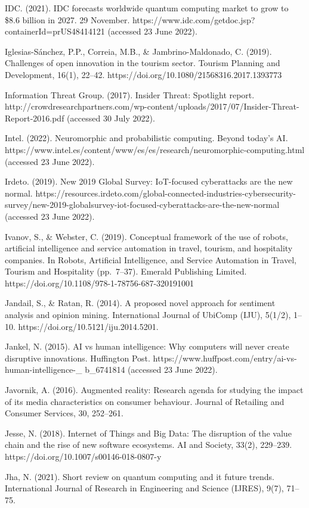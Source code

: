 \documentclass[
  letterpaper,
  DIV=11,
  numbers=noendperiod]{scrreprt}
\begin{document}
IDC. (2021). IDC forecasts worldwide quantum computing market to grow to
\$8.6 billion in 2027. 29 November.
https://www.idc.com/getdoc.jsp?containerId=prUS48414121 (accessed 23
June 2022).

Iglesias-Sánchez, P.P., Correia, M.B., \& Jambrino-Maldonado, C. (2019).
Challenges of open innovation in the tourism sector. Tourism Planning
and Development, 16(1), 22--42.
https://doi.org/10.1080/21568316.2017.1393773

Information Threat Group. (2017). Insider Threat: Spotlight report.
http://crowdresearchpartners.com/wp-content/uploads/2017/07/Insider-Threat-Report-2016.pdf
(accessed 30 July 2022).

Intel. (2022). Neuromorphic and probabilistic computing. Beyond today's
AI.
https://www.intel.es/content/www/es/es/research/neuromorphic-computing.html
(accessed 23 June 2022).

Irdeto. (2019). New 2019 Global Survey: IoT-focused cyberattacks are the
new normal.
https://resources.irdeto.com/global-connected-industries-cybersecurity-survey/new-2019-globalsurvey-iot-focused-cyberattacks-are-the-new-normal
(accessed 23 June 2022).

Ivanov, S., \& Webster, C. (2019). Conceptual framework of the use of
robots, artificial intelligence and service automation in travel,
tourism, and hospitality companies. In Robots, Artificial Intelligence,
and Service Automation in Travel, Tourism and Hospitality (pp.~7--37).
Emerald Publishing Limited.
https://doi.org/10.1108/978-1-78756-687-320191001

Jandail, S., \& Ratan, R. (2014). A proposed novel approach for
sentiment analysis and opinion mining. International Journal of UbiComp
(IJU), 5(1/2), 1--10. https://doi.org/10.5121/iju.2014.5201.

Jankel, N. (2015). AI vs human intelligence: Why computers will never
create disruptive innovations. Huffington Post.
https://www.huffpost.com/entry/ai-vs-human-intelligence-\_ b\_6741814
(accessed 23 June 2022).

Javornik, A. (2016). Augmented reality: Research agenda for studying the
impact of its media characteristics on consumer behaviour. Journal of
Retailing and Consumer Services, 30, 252--261.

Jesse, N. (2018). Internet of Things and Big Data: The disruption of the
value chain and the rise of new software ecosystems. AI and Society,
33(2), 229--239. https://doi.org/10.1007/s00146-018-0807-y

Jha, N. (2021). Short review on quantum computing and it future trends.
International Journal of Research in Engineering and Science (IJRES),
9(7), 71--75.
\end{document}

